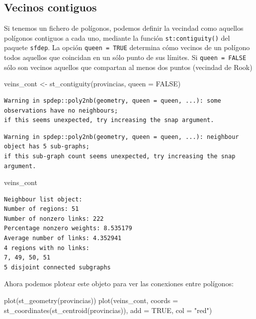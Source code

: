 \documentclass[
  letterpaper,
  DIV=11,
  numbers=noendperiod]{scrreprt}
\newenvironment{Shaded}{\begin{snugshade}}{\end{snugshade}}
\newcommand{\AttributeTok}[1]{\textcolor[rgb]{0.40,0.45,0.13}{#1}}
\newcommand{\ConstantTok}[1]{\textcolor[rgb]{0.56,0.35,0.01}{#1}}
\newcommand{\FunctionTok}[1]{\textcolor[rgb]{0.28,0.35,0.67}{#1}}
\newcommand{\NormalTok}[1]{\textcolor[rgb]{0.00,0.23,0.31}{#1}}
\newcommand{\OtherTok}[1]{\textcolor[rgb]{0.00,0.23,0.31}{#1}}
\newcommand{\StringTok}[1]{\textcolor[rgb]{0.13,0.47,0.30}{#1}}
\begin{document}
\hypertarget{vecinos-contiguos}{%
\subsection{Vecinos contiguos}\label{vecinos-contiguos}}

Si tenemos un fichero de polígonos, podemos definir la vecindad como
aquellos polígonos contiguos a cada uno, mediante la función
\texttt{st:contiguity()} del paquete \texttt{sfdep}. La opción
\texttt{queen\ =\ TRUE} determina cómo vecinos de un polígono todos
aquellos que coincidan en un sólo punto de sus límites. Si
\texttt{queen\ =\ FALSE} sólo son vecinos aquellos que compartan al
menos dos puntos (vecindad de Rook)

\begin{Shaded}
\begin{Highlighting}[]
\NormalTok{veins\_cont }\OtherTok{\textless{}{-}} \FunctionTok{st\_contiguity}\NormalTok{(provincias, }\AttributeTok{queen =} \ConstantTok{FALSE}\NormalTok{)}
\end{Highlighting}
\end{Shaded}

\begin{verbatim}
Warning in spdep::poly2nb(geometry, queen = queen, ...): some observations have no neighbours;
if this seems unexpected, try increasing the snap argument.
\end{verbatim}

\begin{verbatim}
Warning in spdep::poly2nb(geometry, queen = queen, ...): neighbour object has 5 sub-graphs;
if this sub-graph count seems unexpected, try increasing the snap argument.
\end{verbatim}

\begin{Shaded}
\begin{Highlighting}[]
\NormalTok{veins\_cont}
\end{Highlighting}
\end{Shaded}

\begin{verbatim}
Neighbour list object:
Number of regions: 51 
Number of nonzero links: 222 
Percentage nonzero weights: 8.535179 
Average number of links: 4.352941 
4 regions with no links:
7, 49, 50, 51
5 disjoint connected subgraphs
\end{verbatim}

Ahora podemos plotear este objeto para ver las conexiones entre
polígonos:

\begin{Shaded}
\begin{Highlighting}[]
\FunctionTok{plot}\NormalTok{(}\FunctionTok{st\_geometry}\NormalTok{(provincias))}
\FunctionTok{plot}\NormalTok{(veins\_cont, }\AttributeTok{coords =} \FunctionTok{st\_coordinates}\NormalTok{(}\FunctionTok{st\_centroid}\NormalTok{(provincias)), }\AttributeTok{add =} \ConstantTok{TRUE}\NormalTok{, }\AttributeTok{col =} \StringTok{"red"}\NormalTok{)}
\end{Highlighting}
\end{Shaded}
\end{document}
